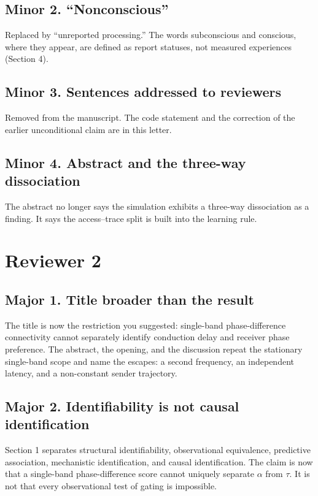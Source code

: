 \documentclass[11pt]{article}
\begin{document}
\subsection*{Minor 2. ``Nonconscious''}
Replaced by ``unreported processing.'' The words subconscious and conscious, where they appear, are defined as report statuses, not measured experiences (Section 4).

\subsection*{Minor 3. Sentences addressed to reviewers}
Removed from the manuscript. The code statement and the correction of the earlier unconditional claim are in this letter.

\subsection*{Minor 4. Abstract and the three-way dissociation}
The abstract no longer says the simulation exhibits a three-way dissociation as a finding. It says the access--trace split is built into the learning rule.

\section*{Reviewer 2}

\subsection*{Major 1. Title broader than the result}
The title is now the restriction you suggested: single-band phase-difference connectivity cannot separately identify conduction delay and receiver phase preference. The abstract, the opening, and the discussion repeat the stationary single-band scope and name the escapes: a second frequency, an independent latency, and a non-constant sender trajectory.

\subsection*{Major 2. Identifiability is not causal identification}
Section 1 separates structural identifiability, observational equivalence, predictive association, mechanistic identification, and causal identification. The claim is now that a single-band phase-difference score cannot uniquely separate \(\alpha\) from \(\tau\). It is not that every observational test of gating is impossible.
\end{document}
